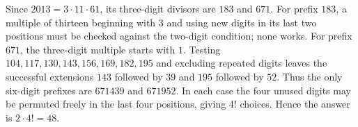 Since $2013=3\cdot11\cdot61$, its three-digit divisors are $183$ and $671$. For prefix $183$, a multiple of thirteen beginning with $3$ and using new digits in its last two positions must be checked against the two-digit condition; none works. For prefix $671$, the three-digit multiple starts with $1$. Testing $104,117,130,143,156,169,182,195$ and excluding repeated digits leaves the successful extensions $143$ followed by $39$ and $195$ followed by $52$. Thus the only six-digit prefixes are $671439$ and $671952$.
In each case the four unused digits may be permuted freely in the last four positions, giving $4!$ choices. Hence the answer is $\boxed{2\cdot4!=48}$.
